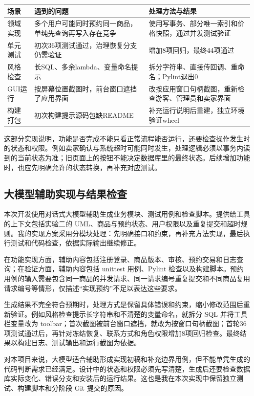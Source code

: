 \documentclass[11pt,a4paper]{ctexart}
\begin{document}
\begin{tabularx}{\textwidth}{p{}Y Y}
\toprule 场景 & 遇到的问题 & 处理方法与结果\\\midrule
领域实现 & 多个用户可能同时预约同一商品，单纯先查询再写入存在竞争 & 使用写事务、部分唯一索引和价格快照，通过并发测试验证\\
单元测试 & 初次36项测试通过，治理恢复分支仍需验证 & 增加8项回归，最终44项通过\\
风格检查 & 长SQL、多余lambda、变量命名提示 & 拆分字符串、直接传回调、重命名；Pylint退出0\\
GUI运行 & 按屏幕位置截图时，前台窗口遮挡了应用界面 & 改按应用窗口句柄截图，重新检查游客、管理员和卖家界面\\
构建打包 & 初次构建提示源码包缺README & 补充运行说明后重建，独立环境验证wheel\\
\bottomrule
\end{tabularx}

这部分实现说明，功能是否完成不能只看正常流程能否运行，还要检查操作发生时的状态和权限。例如卖家确认与系统超时可能同时发生，处理逻辑必须以事务内读到的当前状态为准；旧页面上的按钮不能决定数据库里的最终状态。后续增加功能时，也应先明确允许的状态转换，再补充对应测试。

\subsection{大模型辅助实现与结果检查}
本次开发使用对话式大模型辅助生成业务模块、测试用例和检查脚本。提供给工具的上下文包括实验二的 UML、商品与预约状态、用户权限以及重复提交和超时规则。我的实现方案采用分模块处理：先明确接口和约束，再补充方法实现，最后执行测试和代码检查，依据实际输出继续修正。

在功能实现方面，辅助内容包括注册登录、商品版本、审核、预约交易和日志查询；在验证方面，辅助内容包括 unittest 用例、Pylint 检查以及构建脚本。预约用例的输入需要包含同一商品的并发请求、同一请求编号重复提交和不同商品复用请求编号等情形，仅描述“实现预约”不足以表达这些要求。

生成结果不完全符合预期时，处理方式是保留具体错误和约束，缩小修改范围后重新验证。例如风格检查提示长字符串和不清楚的变量命名，就拆分 SQL 并将工具栏变量改为 toolbar；首次截图被前台窗口遮挡，就改为按窗口句柄截图；首轮36项测试通过后，再针对冻结恢复、联系方式和角色权限增加8项回归检查。最终结果以构建日志、测试输出和运行截图为依据。

对本项目来说，大模型适合辅助形成实现初稿和补充边界用例，但不能单凭生成的代码判断需求已经满足。设计中的状态和权限必须先写清楚，生成后还要检查数据库实际变化、错误分支和安装后的运行结果。这也是我在本次实现中保留独立测试、构建脚本和分阶段 Git 提交的原因。
\end{document}
